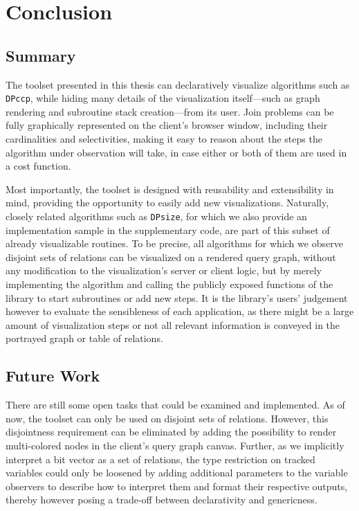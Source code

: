 \section{Conclusion}

\vspace{-0.2cm}
\subsection{Summary}

The toolset presented in this thesis can declaratively visualize algorithms such as \texttt{DPccp}, while hiding many details of the visualization itself—such as graph rendering and subroutine stack creation—from its user. Join problems can be fully graphically represented on the client's browser window, including their cardinalities and selectivities, making it easy to reason about the steps the algorithm under observation will take, in case either or both of them are used in a cost function.

 Most importantly, the toolset is designed with reusability and extensibility in mind, providing the opportunity to easily add new visualizations. Naturally, closely related algorithms such as \texttt{DPsize}\cite{moerkotte2006analysis}, for which we also provide an implementation sample in the supplementary code, are part of this subset of already visualizable routines. To be precise, all algorithms for which we observe disjoint sets of relations can be visualized on a rendered query graph, without any modification to the visualization's server or client logic, but by merely implementing the algorithm and calling the publicly exposed functions of the library to start subroutines or add new steps. It is the library's users' judgement however to evaluate the sensibleness of each application, as there might be a large amount of visualization steps or not all relevant information is conveyed in the portrayed graph or table of relations.

 \vspace{-0.1cm}
\subsection{Future Work}

There are still some open tasks that could be examined and implemented. As of now, the toolset can only be used on disjoint sets of relations. However, this disjointness requirement can be eliminated by adding the possibility to render multi-colored nodes in the client's query graph canvas.
Further, as we implicitly interpret a bit vector as a set of relations, the type restriction on tracked variables could only be loosened by adding additional parameters to the variable observers to describe how to interpret them and format their respective outputs, thereby however posing a trade-off between declarativity and genericness.

